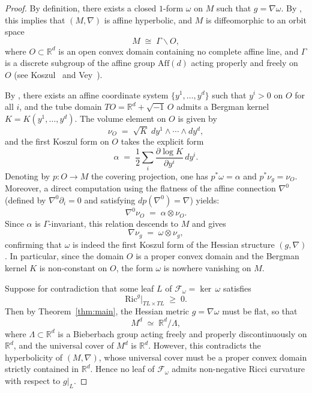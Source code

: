 \begin{proof}

By definition, there exists a closed $1$-form $\omega$ on $M$ such that
$g = \nabla\omega$. By \citep{koszul1968, shima2007},
this implies that $(M, \nabla)$ is affine hyperbolic, and $M$ is
diffeomorphic to an orbit space
\[
M \;\cong\; \Gamma \backslash O,
\]
where $O \subset \mathbb{R}^d$ is an open convex domain containing no
complete affine line, and $\Gamma$ is a discrete subgroup of the affine
group $\mathrm{Aff}(d)$ acting properly and freely on $O$
(see Koszul~\citep{koszul1968} and Vey~\citep{vey1969}).

By \citep[Theorem~8.4]{shima2007}, there exists an affine coordinate
system $\{y^1, \ldots, y^d\}$ such that $y^i > 0$ on $O$ for all $i$,
and the tube domain $TO = \mathbb{R}^d + \sqrt{-1}\,O$ admits a Bergman
kernel $K = K(y^1, \ldots, y^d)$. The volume element on $O$ is given by
\[
\nu_O \;=\; \sqrt{K}\; dy^1 \wedge \cdots \wedge dy^d,
\]
and the first Koszul form on $O$ takes the explicit form
\[
\alpha \;=\; \frac{1}{2} \sum_{i} \frac{\partial \log K}{\partial y^i}\, dy^i.
\]
Denoting by $p : O \to M$ the covering projection, one has $p^*\omega = \alpha$
and $p^*\nu_g = \nu_O$. Moreover, a direct computation using the flatness
of the affine connection $\nabla^0$ (defined by $\nabla^0 \partial_i = 0$
and satisfying $dp(\nabla^0) = \nabla$) yields:
\[
\nabla^0 \nu_O \;=\; \alpha \otimes \nu_O.
\]
Since $\alpha$ is $\Gamma$-invariant, this relation descends to $M$ and gives
\[
\nabla \nu_g \;=\; \omega \otimes \nu_g,
\]
confirming that $\omega$ is indeed the first Koszul form of the Hessian
structure $(g, \nabla)$. In particular, since the domain $O$ is a proper
convex domain and the Bergman kernel $K$ is non-constant on $O$, the
form $\omega$ is nowhere vanishing on $M$.

Suppose for contradiction that some leaf $L$ of
$\mathcal{F}_\omega = \ker\,\omega$ satisfies
\[
\mathrm{Ric}^g\big|_{TL \times TL} \;\geq\; 0.
\]
Then by Theorem~\ref{thm:main}, the Hessian metric $g = \nabla\omega$ must
be flat, so that
\[
M^d \;\simeq\; \mathbb{R}^d / \Lambda,
\]
where $\Lambda \subset \mathbb{R}^d$ is a Bieberbach group acting freely
and properly discontinuously on $\mathbb{R}^d$, and the universal cover
of $M^d$ is $\mathbb{R}^d$. However, this contradicts the hyperbolicity
of $(M, \nabla)$, whose universal cover must be a proper convex domain
strictly contained in $\mathbb{R}^d$. Hence no leaf of $\mathcal{F}_\omega$
admits non-negative Ricci curvature with respect to $g|_L$.


\end{proof}
